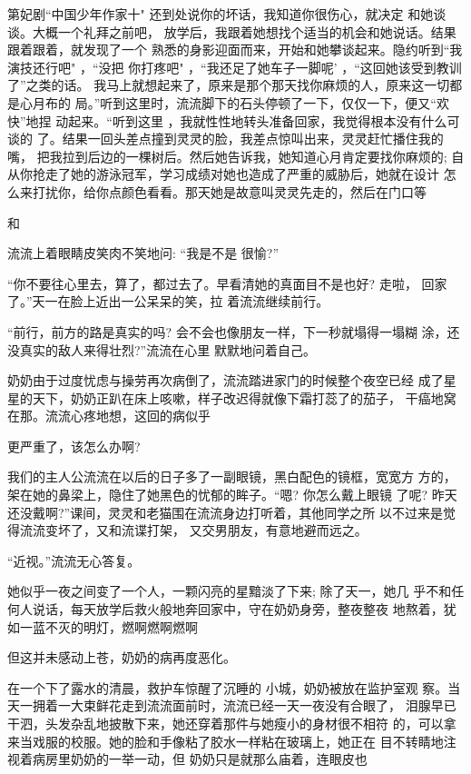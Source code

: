\documentclass{article}
\begin{document}
第妃剧“中国少年作家十"
还到处说你的坏话，我知道你很伤心，就决定
\newpage
和她谈谈。大概一个礼拜之前吧，
放学后，我跟着她想找个适当的机会和她说话。结果跟着跟着，就发现了一个
熟悉的身影迎面而来，开始和她攀谈起来。隐约听到“我演技还行吧" ，“没把
你打疼吧" ，“我还足了她车子一脚呢' ，“这回她该受到教训了”之类的话。
我马上就想起来了，原来是那个那天找你麻烦的人，原来这一切都是心月布的
局。”听到这里时，流流脚下的石头停顿了一下，仅仅一下，便又“欢快”地捏
动起来。“听到这里 ，我就性性地转头准备回家，我觉得根本没有什么可谈的
了。结果一回头差点撞到灵灵的脸，我差点惊叫出来，灵灵赶忙播住我的嘴，
把我拉到后边的一棵树后。然后她告诉我，她知道心月肯定要找你麻烦的; 自
从你抢走了她的游泳冠军，学习成绩对她也造成了严重的威胁后，她就在设计
怎么来打扰你，给你点颜色看看。那天她是故意叫灵灵先走的，然后在门口等
\newpage


和 

流流上着眼睛皮笑肉不笑地问: “我是不是
很愉?” 

“你不要往心里去，算了，都过去了。早看清她的真面目不是也好? 走啦，
回家了。”天一在脸上近出一公呆呆的笑，拉
着流流继续前行。 

“前行，前方的路是真实的吗? 会不会也像朋友一样，下一秒就塌得一塌糊
涂，还没真实的敌人来得壮烈?”流流在心里
默默地问着自己。 

奶奶由于过度忧虑与操劳再次病倒了，流流踏进家门的时候整个夜空已经
成了星星的天下，奶奶正趴在床上咳嗽，样子改迟得就像下霜打蕊了的茄子，
干癌地窝在那。流流心疼地想，这回的病似乎

\newpage
更严重了，该怎么办啊? 

我们的主人公流流在以后的日子多了一副眼镜，黑白配色的镜框，宽宽方
方的，架在她的鼻梁上，隐住了她黑色的忧郁的眸子。“嗯? 你怎么戴上眼镜
了呢? 昨天还没戴啊?”课间，灵灵和老猫围在流流身边打听着，其他同学之所
以不过来是觉得流流变坏了，又和流谍打架，
又交男朋友，有意地避而远之。 


“近视。”流流无心答复。 

她似乎一夜之间变了一个人，一颗闪亮的星黯淡了下来; 除了天一，她几
乎不和任何人说话，每天放学后救火般地奔回家中，守在奶奶身旁，整夜整夜
地熬着，犹如一蓝不灭的明灯，燃啊燃啊燃啊


但这并未感动上苍，奶奶的病再度恶化。 

在一个下了露水的清晨，救护车惊醒了沉睡的
\newpage
小城，奶奶被放在监护室观
察。当天一拥着一大束鲜花走到流流面前时，流流已经一天一夜没有合眼了，
泪腺早已干泗，头发杂乱地披散下来，她还穿着那件与她瘦小的身材很不相符
的，可以拿来当戏服的校服。她的脸和手像粘了胶水一样粘在玻璃上，她正在
目不转睛地注视着病房里奶奶的一举一动，但
奶奶只是就那么庙着，连眼皮也 
\end{document}
